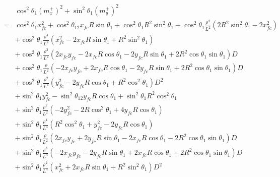 \documentclass[12pt]{article}
\begin{document}
\begin{align}
    &\cos^2\theta_1(m_x^+)^2 + \sin^2\theta_1(m_y^+)^2\\
    =& \cos^2\theta_1x_{fc}^2 +\cos^2\theta_12x_{fc}R\sin\theta_1 + \cos^2\theta_1R^2\sin^2\theta_1 + \cos^2\theta_1\frac{\rho^2}{L^2}(2R^2\sin^2\theta_1 -2x_{fc}^2)  \nonumber\\
    &+ \cos^2\theta_1\frac{\rho^4}{L^4}(x_{fc}^2 - 2x_{fc}R\sin\theta_1 + R^2\sin^2\theta_1) \nonumber\\
    &+ \cos^2\theta_1\frac{\rho^3}{L^4}(2x_{fc}y_{fc} -2x_{fc}R\cos\theta_1  -2y_{fc}R\sin\theta_1 +2R^2\cos\theta_1\sin\theta_1)D  \nonumber\\
    &+ \cos^2\theta_1\frac{\rho}{L^2}(-2x_{fc}y_{fc} +2x_{fc}R\cos\theta_1 -2y_{fc}R\sin\theta_1 +2R^2\cos\theta_1\sin\theta_1)D  \nonumber\\
    &+ \cos^2\theta_1\frac{\rho^2}{L^4}(y_{fc}^2 -2y_{fc}R\cos\theta_1 +R^2\cos^2\theta_1)D^2 \nonumber\\
    &+ \sin^2\theta_1y_{fc}^2 -\sin^2\theta_12y_{fc}R\cos\theta_1 + \sin^2\theta_1R^2\cos^2\theta_1\nonumber\\
    &+ \sin^2\theta_1\frac{\rho^2}{L^2}(-2y_{fc}^2  -2R\cos^2\theta_1 + 4y_{fc}R\cos\theta_1) \nonumber\\
    &+\sin^2\theta_1\frac{\rho^4}{L^4}(R^2\cos^2\theta_1 + y_{fc}^2 -2y_{fc}R\cos\theta_1) \nonumber\\
    &+ \sin^2\theta_1\frac{\rho}{L^2}(2x_{fc}y_{fc} + 2y_{fc}R\sin\theta_1  -2x_{fc}R\cos\theta_1 -2R^2\cos\theta_1\sin\theta_1)D \nonumber\\
    &+ \sin^2\theta_1\frac{\rho^3}{L^4}(- 2x_{fc}y_{fc} - 2y_{fc}R\sin\theta_1 + 2x_{fc}R\cos\theta_1 + 2R^2\cos\theta_1\sin\theta_1)D \nonumber\\
    &+ \sin^2\theta_1\frac{\rho^2}{L^4}(x_{fc}^2 + 2x_{fc}R\sin\theta_1 + R^2\sin^2\theta_1)D^2
\end{align}
\end{document}
